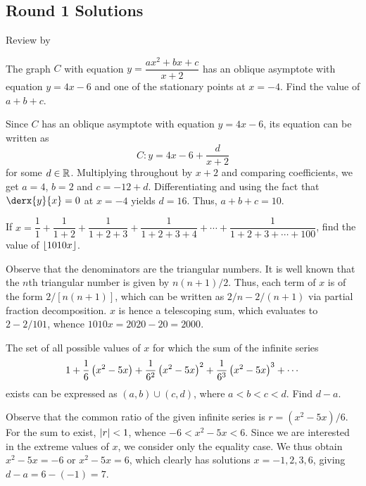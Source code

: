 \subsection{Round 1 Solutions}\label{S::2023-O-1}

\begin{resources}
    Review by 
\end{resources}

\begin{question}[10]\label{A::2023-O-1-1}
    The graph $C$ with equation $y = \dfrac{ax^2 + bx + c}{x+2}$ has an oblique asymptote with equation $y = 4x - 6$ and one of the stationary points at $x = -4$. Find the value of $a + b + c$.
\end{question}
\begin{solution*}
    Since $C$ has an oblique asymptote with equation $y = 4x - 6$, its equation can be written as \[C: y = 4x - 6 + \frac{d}{x+2}\] for some $d \in \mathbb{R}$. Multiplying throughout by $x+2$ and comparing coefficients, we get $a = 4$, $b = 2$ and $c = -12 + d$. Differentiating and using the fact that $\derx{y}{x} = 0$ at $x = -4$ yields $d = 16$. Thus, $a + b + c = 10$.
\end{solution*}

\begin{question}[2000]\label{A::2023-O-1-2}
    If $x = \dfrac{1}{1} + \dfrac{1}{1+2} + \dfrac{1}{1+2+3} + \dfrac{1}{1+2+3+4} + \cdots + \dfrac{1}{1 + 2 + 3 + \cdots + 100}$, find the value of $\left\lfloor 1010x \right\rfloor$.
\end{question}
\begin{solution*}
    Observe that the denominators are the triangular numbers. It is well known that the $n$th triangular number is given by $n(n+1)/2$. Thus, each term of $x$ is of the form $2/[n(n+1)]$, which can be written as $2/n - 2/(n+1)$ via partial fraction decomposition. $x$ is hence a telescoping sum, which evaluates to $2 - 2/101$, whence $1010x = 2020 - 20 = 2000$.
\end{solution*}

\begin{question}[7]\label{A::2023-O-1-3}
    The set of all possible values of $x$ for which the sum of the infinite series \[1 + \dfrac16 \left( x^2 - 5x \right) + \dfrac1{6^2} \left( x^2 - 5x \right)^2 + \dfrac1{6^3} \left( x^2 - 5x \right)^3 + \cdots\] exists can be expressed as $(a, b) \cup (c, d)$, where $a < b < c < d$. Find $d - a$.
\end{question}
\begin{solution*}
    Observe that the common ratio of the given infinite series is $r = (x^2 - 5x)/6$. For the sum to exist, $\left\lvert r \right\rvert < 1$, whence $-6 < x^2 - 5x < 6$. Since we are interested in the extreme values of $x$, we consider only the equality case. We thus obtain $x^2 - 5x = -6$ or $x^2 - 5x = 6$, which clearly has solutions $x = -1, 2, 3, 6$, giving $d - a = 6 - (-1) = 7$.
\end{solution*}

